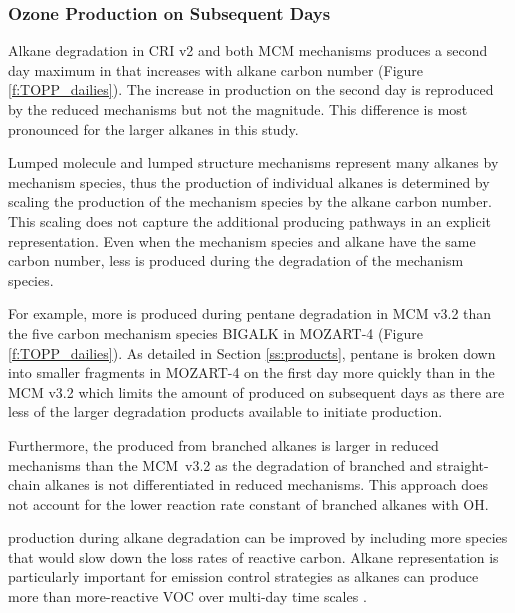 \subsubsection{Ozone Production on Subsequent Days} \label{sss:profiles} %
%
Alkane degradation in CRI v2 and both MCM mechanisms produces a second day maximum in  that increases with alkane carbon number (Figure \ref{f:TOPP_dailies}).
The increase in  production on the second day is reproduced by the reduced mechanisms but not the magnitude.
This difference is most pronounced for the larger alkanes in this study.

Lumped molecule and lumped structure mechanisms represent many alkanes by mechanism species, thus the  production of individual alkanes is determined by scaling the  production of the mechanism species by the alkane carbon number.
This scaling does not capture the additional  producing pathways in an explicit representation.
Even when the mechanism species and alkane have the same carbon number, less  is produced during the degradation of the mechanism species.

For example, more  is produced during pentane degradation in MCM v3.2 than the five carbon mechanism species BIGALK in MOZART-4 (Figure \ref{f:TOPP_dailies}).
As detailed in Section \ref{ss:products}, pentane is broken down into smaller fragments in MOZART-4 on the first day more quickly than in the MCM v3.2 which limits the amount of  produced on subsequent days as there are less of the larger degradation products available to initiate  production.

Furthermore, the  produced from branched alkanes is larger in reduced mechanisms than the \mbox{MCM v3.2} as the degradation of branched and straight-chain alkanes is not differentiated in reduced mechanisms.
This approach does not account for the lower reaction rate constant of branched alkanes with OH.  

 production during alkane degradation can be improved by including more species that would slow down the loss rates of reactive carbon.
Alkane representation is particularly important for emission control strategies as alkanes can produce more  than more-reactive VOC over multi-day time scales \citep{Butler:2011}.
%
